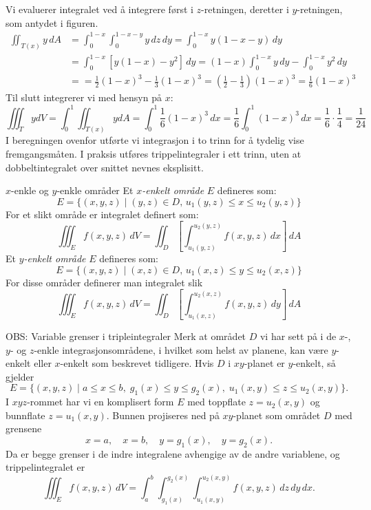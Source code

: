 \begin{eks}{}
\begin{minipage}{8cm}
\end{minipage}

 Vi evaluerer integralet ved å integrere først i \(z\)-retningen, deretter i \(y\)-retningen, som antydet i figuren.
\begin{align*}
\iint_{T(x)} y \, dA &= \int_0^{1 - x} \int_0^{1 - x - y} y \, dz \, dy = \int_0^{1 - x} y(1 - x - y) \, dy\\
&= \int_0^{1 - x} \left[y(1 - x) - y^2\right] \, dy 
= (1 - x) \int_0^{1 - x} y \, dy - \int_0^{1 - x} y^2 \, dy\\
&= = \frac{1}{2}(1 - x)^3 - \frac{1}{3}(1 - x)^3 
= \left( \frac{1}{2} - \frac{1}{3} \right)(1 - x)^3 
= \frac{1}{6}(1 - x)^3
\end{align*}
Til slutt integrerer vi med hensyn på \(x\):
\[
\iiint_T y dV = \int_0^1 \iint_{T(x)} y dA= \int_0^1 \frac{1}{6}(1 - x)^3 \, dx = \frac{1}{6} \int_0^1 (1 - x)^3 \, dx
= \frac{1}{6} \cdot \frac{1}{4} = \frac{1}{24}
\]
I beregningen ovenfor utførte vi integrasjon i to trinn for å tydelig vise fremgangsmåten. I praksis utføres trippelintegraler i ett trinn, uten at dobbeltintegralet over snittet nevnes eksplisitt.
\label{ex:tetrahedron}
\end{eks}

\begin{defn}{$x$-enkle og $y$-enkle områder}
Et $x$\emph{-enkelt område} $E$ defineres som:
\[
E = \{(x, y, z) \mid (y, z) \in D,\, u_1(y, z) \leq x \leq u_2(y, z)\}
\]
For et slikt område er integralet definert som:
\[
\iiint_E f(x, y, z)\, dV = \iint_D \left[\int_{u_1(y,z)}^{u_2(y,z)} f(x, y, z)\, dx\right]\, dA
\]
Et $y$\emph{-enkelt område} $E$ defineres som:
\[
E = \{(x, y, z) \mid (x, z) \in D,\, u_1(x, z) \leq y \leq u_2(x, z)\}
\]
For disse områder definerer man integralet slik 
\[
\iiint_E f(x, y, z)\, dV = \iint_D \left[\int_{u_1(x,z)}^{u_2(x,z)} f(x, y, z)\, dy\right]\, dA
\]
\end{defn}

\begin{rem}{OBS: Variable grenser i tripleintegraler}
Merk at området $D$ vi har sett på i de $x$-, $y$- og $z$-enkle integrasjonsområdene, i hvilket som helst av planene, kan være $y$-enkelt eller $x$-enkelt som beskrevet tidligere.
Hvis $D$ i $xy$-planet er $y$-enkelt, så gjelder
\[
E = \{(x,y,z) \mid a \leq x \leq b, \; g_{1}(x) \leq y \leq g_{2}(x), \; u_{1}(x,y) \leq z \leq u_{2}(x,y) \}.
\]
I $xyz$-rommet har vi en komplisert form $E$ med toppflate $z = u_{2}(x,y)$ og bunnflate $z = u_{1}(x,y)$. Bunnen projiseres ned på $xy$-planet som området $D$ med grensene 
\[
x = a, \quad x = b, \quad y = g_{1}(x), \quad y = g_{2}(x).
\]
Da er begge grenser i de indre integralene avhengige av de andre variablene, og trippelintegralet er
\[
\iiint_{E} f(x,y,z) \, dV 
= \int_{a}^{b} \int_{g_{1}(x)}^{g_{2}(x)} \int_{u_{1}(x,y)}^{u_{2}(x,y)} 
f(x,y,z) \, dz \, dy \, dx.
\]
\end{rem}


